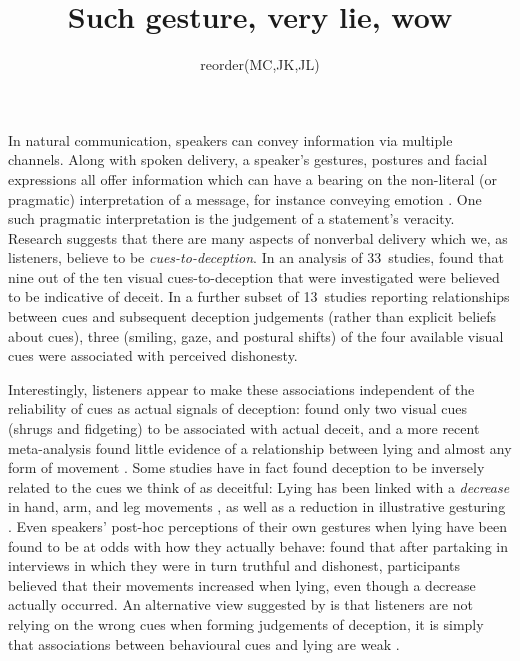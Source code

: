 \documentclass[a4paper,man,natbib]{apa6}
\title{Such gesture, very lie, wow}
\author{reorder(MC,JK,JL)}
\affiliation{Psychology, PPLS, University of Edinburgh}
\newcommand*{\term}[1]{\emph{#1}} %
\begin{document}
\maketitle
\linenumbers
\noindent
In natural communication, speakers can convey information via multiple channels.
Along with spoken delivery, a speaker's gestures, postures and facial expressions all offer information which can have a bearing on the non-literal (or pragmatic) interpretation of a message, for instance conveying emotion \citep{Busso2004, Gregersen2005}.
One such pragmatic interpretation is the judgement of a statement's veracity.
Research suggests that there are many aspects of nonverbal delivery which we, as listeners, believe to be \term{cues-to-deception}. 
In an analysis of 33~studies, \citet{Zuckerman1981} found that nine out of the ten visual cues-to-deception that were investigated were believed to be indicative of deceit. 
In a further subset of 13~studies reporting relationships between cues and subsequent deception judgements (rather than explicit beliefs about cues), three (smiling, gaze, and postural shifts) of the four available visual cues were associated with perceived dishonesty.

Interestingly, listeners appear to make these associations independent of the reliability of cues as actual signals of deception: \citet{Zuckerman1981} found only two visual cues (shrugs and fidgeting) to be associated with actual deceit, and a more recent meta-analysis found little evidence of a relationship between lying and almost any form of movement \citep{DePaulo2003}.
Some studies have in fact found deception to be inversely related to the cues we think of as deceitful:
Lying has been linked with a \emph{decrease} in hand, arm, and leg movements \citep[e.g.][]{DePaulo1992, Ekman1989, Vrij1995}, as well as a reduction in illustrative gesturing \citep[e.g.][]{DePaulo2003, Cohen2010}.
Even speakers' post-hoc perceptions of their own gestures when lying have been found to be at odds with how they actually behave:
\citet{Vrij1996} found that after partaking in interviews in which they were in turn truthful and dishonest, participants believed that their movements increased when lying, even though a decrease actually occurred.
An alternative view suggested by \citet{Hartwig2011} is that listeners are not relying on the wrong cues when forming judgements of deception, it is simply that associations between behavioural cues and lying are weak \citep{Hartwig2011}.
\end{document}
